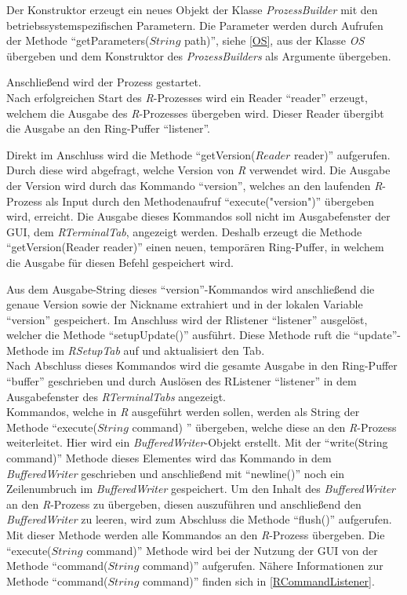 \documentclass[a4paper, 12pt]{report} %
\begin{document}
Der Konstruktor erzeugt ein neues Objekt der Klasse \textit{ProzessBuilder} mit den betriebssystemspezifischen Parametern. Die Parameter werden durch Aufrufen der Methode "`getParameters($String$ path)"', siehe \ref{OS}, aus der Klasse \textit{OS} übergeben und dem Konstruktor des \textit{ProzessBuilders} als Argumente übergeben.

Anschließend wird der Prozess gestartet.\\

Nach erfolgreichen Start des \textit{R}-Prozesses wird ein Reader "`reader"' erzeugt, welchem die Ausgabe des \textit{R}-Prozesses übergeben wird. Dieser Reader übergibt die Ausgabe an den Ring-Puffer "`listener"'.

Direkt im Anschluss wird die Methode "`getVersion($Reader$ reader)"' aufgerufen. Durch diese wird abgefragt, welche Version von \textit{R} verwendet wird.
Die Ausgabe der Version wird durch das Kommando "`version"', welches an den laufenden \textit{R}-Prozess als Input durch den Methodenaufruf "`execute("version")"' übergeben wird, erreicht. Die Ausgabe dieses Kommandos soll nicht im Ausgabefenster der GUI, dem \textit{RTerminalTab}, angezeigt werden. Deshalb erzeugt die Methode "`getVersion(Reader reader)"' einen neuen, temporären Ring-Puffer, in welchem die Ausgabe für diesen Befehl gespeichert wird. 

Aus dem Ausgabe-String dieses "`version"'-Kommandos wird anschließend die genaue Version sowie der Nickname extrahiert und in der lokalen Variable "`version"' gespeichert. Im Anschluss wird der Rlistener  "`listener"' ausgelöst, welcher die Methode "`setupUpdate()"' ausführt. Diese Methode ruft die "`update"'-Methode im \textit{RSetupTab} auf und aktualisiert den Tab.\\

Nach Abschluss dieses Kommandos wird die gesamte Ausgabe in den Ring-Puffer "`buffer"' geschrieben und durch Auslösen des RListener "`listener"' in dem Ausgabefenster des \textit{RTerminalTabs} angezeigt.\\

Kommandos, welche in \textit{R} ausgeführt werden sollen, werden als String der Methode "`execute($String$ command) "' übergeben, welche diese an den \textit{R}-Prozess weiterleitet. Hier wird ein \textit{BufferedWriter}-Objekt erstellt. Mit der "`write(String command)"' Methode dieses Elementes wird das Kommando in dem \textit{BufferedWriter} geschrieben und anschließend mit "`newline()"' noch ein Zeilenumbruch im \textit{BufferedWriter} gespeichert. Um den Inhalt des \textit{BufferedWriter} an den \textit{R}-Prozess zu übergeben, diesen auszuführen und anschließend den \textit{BufferedWriter} zu leeren, wird zum Abschluss die Methode "`flush()"' aufgerufen.
Mit dieser Methode werden alle Kommandos an den \textit{R}-Prozess übergeben. Die "`execute($String$ command)"' Methode wird bei der Nutzung der GUI von der Methode "`command($String$ command)"' aufgerufen. Nähere Informationen zur Methode "`command($String$ command)"' finden sich in \ref{RCommandListener}.
\end{document}
